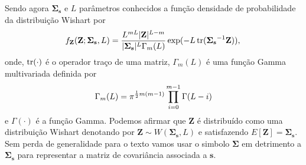 Sendo agora $\mathbf{\Sigma_{s}}$ e $L$ parâmetros conhecidos a função densidade de probabilidade da distribuição Wishart por  
%
\begin{equation}\label{cap_acf_9}
    f_{\mathbf{Z}}(\mathbf{Z};\mathbf{\Sigma_{s}},L)=\frac{L^{mL}|\mathbf{Z}|^{L-m}}{|\mathbf{\Sigma_{s}}|^{L}\Gamma_m(L)} \exp(-L\operatorname{tr}(\mathbf{\Sigma_{s}}^{-1}\mathbf{Z})), \\
\end{equation}
onde, $\operatorname{tr}(\cdot)$ é o operador traço de uma matriz, $\Gamma_m(L)$ é uma função Gamma multivariada definida por
\begin{equation}\label{cap_acf_10}
	\Gamma_m(L)=\pi^{\frac{1}{2}m(m-1)} \prod_{i=0}^{m-1}\Gamma(L-i) \\
\end{equation}
e $\Gamma(\cdot)$ é a função Gamma. Podemos afirmar que $\mathbf{Z}$ é distribuído como uma distribuição Wishart denotando por $\mathbf{Z}\sim W(\mathbf{\Sigma_{s}}, L)$ e satisfazendo $E[\mathbf{Z}]=\mathbf{\Sigma_{s}}$. Sem perda de generalidade para o texto vamos usar o simbolo $\mathbf{\Sigma}$ em detrimento a $\mathbf{\Sigma_{s}}$ para representar a matriz de covariância associada a $\mathbf{s}$.

